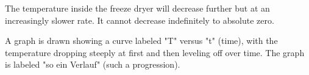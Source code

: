 The temperature inside the freeze dryer will decrease further but at an increasingly slower rate. It cannot decrease indefinitely to absolute zero.  

A graph is drawn showing a curve labeled "T" versus "t" (time), with the temperature dropping steeply at first and then leveling off over time. The graph is labeled "so ein Verlauf" (such a progression).